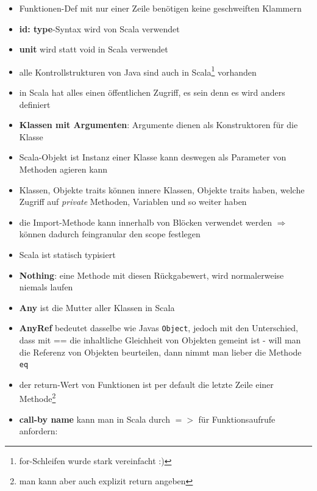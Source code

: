 \begin{itemize}
  \item Funktionen-Def mit nur einer Zeile benötigen keine geschweiften Klammern
  \item \textbf{id: type}-Syntax wird von Scala verwendet 
  \item \textbf{unit} wird statt void in Scala verwendet
  \item alle Kontrollstrukturen von Java sind auch in 
  Scala\footnote{for-Schleifen wurde stark vereinfacht :)} vorhanden
  \item in Scala hat alles einen öffentlichen Zugriff, es sein denn
  es wird anders definiert
  \item \textbf{Klassen mit Argumenten}: Argumente dienen als
  Konstruktoren für die Klasse
  \item Scala-Objekt ist Instanz einer Klasse \und kann deswegen als
  Parameter von Methoden agieren kann
  \item Klassen, Objekte \und traits können innere Klassen, Objekte
  \und traits haben, welche Zugriff auf \textit{private} Methoden,
  Variablen und so weiter haben
  \item die Import-Methode kann innerhalb von Blöcken verwendet werden
  $\Rightarrow$ können dadurch feingranular den scope festlegen
  \item Scala ist statisch typisiert
  \item \textbf{Nothing}: eine Methode mit diesen Rückgabewert, wird
  normalerweise niemals laufen
  \item \textbf{Any} ist die Mutter aller Klassen in Scala
  \item \textbf{AnyRef} bedeutet dasselbe wie Javas \texttt{Object},
  jedoch mit den Unterschied, dass mit == die inhaltliche Gleichheit von 
  Objekten gemeint ist - will man die Referenz von Objekten beurteilen,
  dann nimmt man lieber die Methode \texttt{eq}
  \item der return-Wert von Funktionen ist per default die letzte Zeile einer
  Methode\footnote{man kann aber auch explizit return angeben}
  \item \textbf{call-by name} kann man in Scala durch $=>$ für Funktionsaufrufe 
  anfordern:
  
  
  

\end{itemize}
